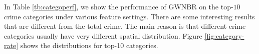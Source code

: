 In Table \ref{tb:categoperf}, we show the performance of GWNBR on the top-$10$ crime categories under various feature settings.  There are some interesting results that are different from the total crime. The main reason is that different crime categories usually have very different spatial distribution. Figure \ref{fig:category-rate} shows the distributions for top-10 categories.
\begin{figure}
	\centering
	
	

\end{figure}
